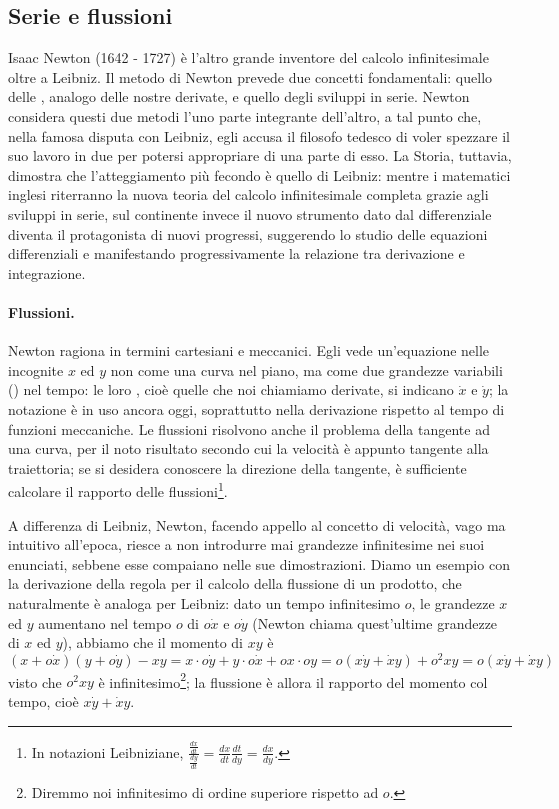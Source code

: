 \subsection{Serie e flussioni}\label{SerieEFlussioni}
\par Isaac Newton (1642 - 1727) \`e l'altro grande inventore del calcolo infinitesimale oltre a Leibniz. Il metodo di Newton prevede due concetti fondamentali: quello delle , analogo delle nostre derivate, e quello degli sviluppi in serie. Newton considera questi due metodi l'uno parte integrante dell'altro, a tal punto che, nella famosa disputa con Leibniz, egli accusa il filosofo tedesco di voler spezzare il suo lavoro in due per potersi appropriare di una parte di esso. La Storia, tuttavia, dimostra che l'atteggiamento pi\`u fecondo \`e quello di Leibniz: mentre i matematici inglesi riterranno la nuova teoria del calcolo infinitesimale completa grazie agli sviluppi in serie, sul continente invece il nuovo strumento dato dal differenziale diventa il protagonista di nuovi progressi, suggerendo lo studio delle equazioni differenziali e manifestando progressivamente la relazione tra derivazione e integrazione.
\paragraph{Flussioni.} Newton ragiona in termini cartesiani e meccanici. Egli vede un'equazione nelle incognite $x$ ed $y$ non come una curva nel piano, ma come due grandezze variabili () nel tempo: le loro , cio\`e quelle che noi chiamiamo derivate, si indicano $\dot{x}$ e $\dot{y}$; la notazione \`e in uso ancora oggi, soprattutto nella derivazione rispetto al tempo di funzioni meccaniche. Le flussioni risolvono anche il problema della tangente ad una curva, per il noto risultato secondo cui la velocit\`a \`e appunto tangente alla traiettoria; se si desidera conoscere la direzione della tangente, \`e sufficiente calcolare il rapporto delle flussioni\footnote{In notazioni Leibniziane, $\frac{\frac{dx}{dt}}{\frac{dy}{dt}} = \frac{dx}{dt} \frac{dt}{dy} = \frac{dx}{dy}$.}.
\par A differenza di Leibniz, Newton, facendo appello al concetto di velocit\`a, vago ma intuitivo all'epoca, riesce a non introdurre mai grandezze infinitesime nei suoi enunciati, sebbene esse compaiano nelle sue dimostrazioni. Diamo un esempio con la derivazione della regola per il calcolo della flussione di un prodotto, che naturalmente \`e analoga per Leibniz: dato un tempo infinitesimo $o$, le grandezze $x$ ed $y$ aumentano nel tempo $o$ di $o\dot{x}$ e $o\dot{y}$ (Newton chiama quest'ultime grandezze  di $x$ ed $y$), abbiamo che il momento di $xy$ \`e $(x + o\dot{x})(y + o\dot{y}) - xy = x \cdot o\dot{y} + y \cdot o\dot{x} + ox \cdot oy = o(x\dot{y} + \dot{x}y) + o^2 xy = o(x\dot{y} + \dot{x}y)$ visto che $o^2 xy$ \`e infinitesimo\footnote{Diremmo noi infinitesimo di ordine superiore rispetto ad $o$.}; la flussione \`e allora il rapporto del momento col tempo, cio\`e $x\dot{y} + \dot{x}y$.
